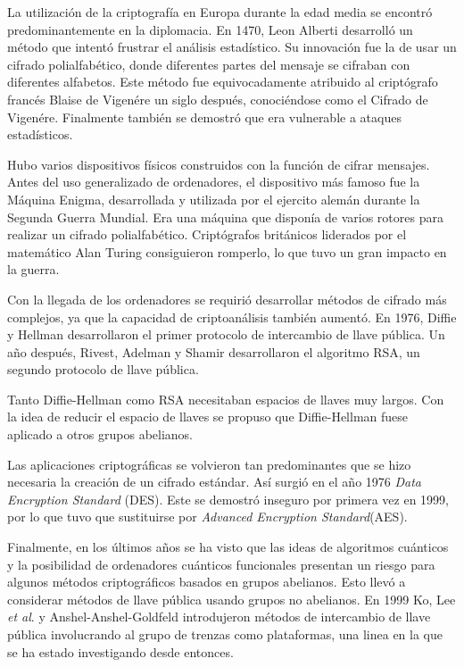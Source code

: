 \documentclass[12pt]{book}
\theoremstyle{definition}
\begin{document}
La utilización de la criptografía en Europa durante la edad media se encontró predominantemente en la diplomacia. En 1470, Leon Alberti desarrolló un método que intentó frustrar el análisis estadístico. Su innovación fue la de usar un cifrado polialfabético, donde diferentes partes del mensaje se cifraban con diferentes alfabetos. Este método fue equivocadamente atribuido al criptógrafo francés Blaise de Vigenére un siglo después, conociéndose como el Cifrado de Vigenére. Finalmente también se demostró que era vulnerable a ataques estadísticos.

Hubo varios dispositivos físicos construidos con la función de cifrar mensajes. Antes del uso generalizado de ordenadores, el dispositivo más famoso fue la Máquina Enigma, desarrollada y utilizada por el ejercito alemán durante la Segunda Guerra Mundial. Era una máquina que disponía de varios rotores para realizar un cifrado polialfabético. Criptógrafos británicos liderados por el matemático Alan Turing consiguieron romperlo, lo que tuvo un gran impacto en la guerra.

Con la llegada de los ordenadores se requirió desarrollar métodos de cifrado más complejos, ya que la capacidad de criptoanálisis también aumentó. En 1976, Diffie y Hellman desarrollaron el primer protocolo de intercambio de llave pública. Un año después, Rivest, Adelman y Shamir desarrollaron el algoritmo RSA, un segundo protocolo de llave pública. 

Tanto Diffie-Hellman como RSA necesitaban espacios de llaves muy largos. Con la idea de reducir el espacio de llaves se propuso que Diffie-Hellman fuese aplicado a otros grupos abelianos.

Las aplicaciones criptográficas se volvieron tan predominantes que se hizo necesaria la creación de un cifrado estándar. Así surgió en el año 1976 \textit{Data Encryption Standard} (DES). Este se demostró inseguro por primera vez en 1999, por lo que tuvo que sustituirse por \textit{Advanced Encryption Standard}(AES).




Finalmente, en los últimos años se ha visto que las ideas de algoritmos cuánticos y la posibilidad de ordenadores cuánticos funcionales presentan un riesgo para algunos métodos criptográficos basados en grupos abelianos. Esto llevó a considerar métodos de llave pública usando grupos no abelianos. En 1999 Ko, Lee \textit{et al}. y Anshel-Anshel-Goldfeld introdujeron métodos de intercambio de llave pública involucrando al grupo de trenzas como plataformas, una linea en la que se ha estado investigando desde entonces.
\end{document}
